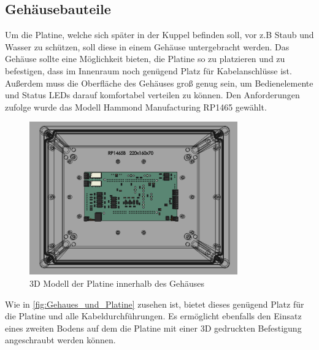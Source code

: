 \subsection{Gehäusebauteile}
Um die Platine, welche sich später in der Kuppel befinden soll, vor z.B Staub und Wasser zu schützen, soll diese in einem Gehäuse untergebracht werden. Das Gehäuse sollte eine Möglichkeit bieten, die Platine so zu platzieren und zu befestigen, dass im Innenraum noch genügend Platz für Kabelanschlüsse ist. Außerdem muss die Oberfläche des Gehäuses groß genug sein, um Bedienelemente und Status LEDs darauf komfortabel verteilen zu können. Den Anforderungen zufolge wurde das Modell Hammond Manufacturing RP1465 gewählt.
\begin{figure}[H]
	\centering
	\includegraphics[width=0.8\textwidth]{images/Hardware/Platine_in_gehause.PNG}
	\caption{3D Modell der Platine innerhalb des Gehäuses}
	\label{fig:Gehaues_und_Platine}
\end{figure}
\noindent Wie in \autoref{fig:Gehaues_und_Platine} zusehen ist, bietet dieses genügend Platz für die Platine und alle Kabeldurchführungen. Es ermöglicht ebenfalls den Einsatz eines zweiten Bodens auf dem die Platine mit einer 3D gedruckten Befestigung angeschraubt werden können.\\

